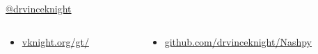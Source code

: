 \documentclass{beamer}
\begin{document}
\begin{frame}
        \begin{center}
               \href{https://twitter.com/drvinceknight}{@drvinceknight}
        \end{center}

   \begin{columns}
        \begin{column}{.4\textwidth}
            \begin{itemize}
                \item
                    \href{https://vknight.org/gt/}{vknight.org/gt/}
            \end{itemize}
        \end{column}
        \begin{column}{.6\textwidth}
            \begin{itemize}
                \item \href{https://github.com/drvinceknight/Nashpy}{github.com/drvinceknight/Nashpy}
            \end{itemize}
        \end{column}
   \end{columns}
\end{frame}
\end{document}
